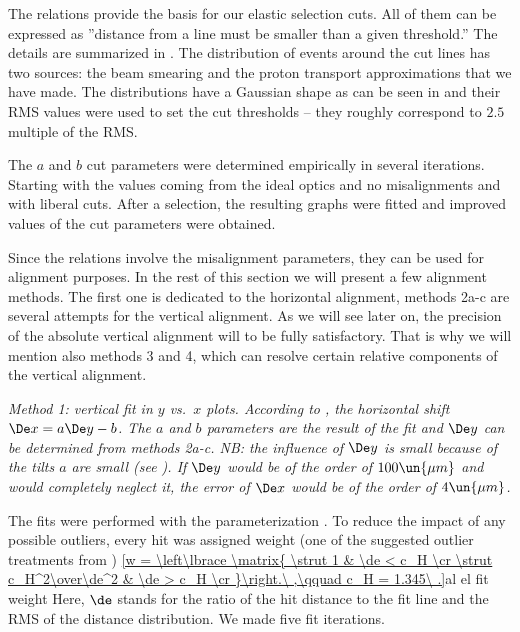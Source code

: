 The relations  provide the basis for our elastic selection cuts. All of them can be expressed as ''distance from a line must be smaller than a given threshold.'' The details are summarized in . The distribution of events around the cut lines has two sources: the beam smearing and the proton transport approximations that we have made. The distributions have a Gaussian shape as can be seen in  and their RMS values were used to set the cut thresholds -- they roughly correspond to $2.5$ multiple of the RMS.

The $a$ and $b$ cut parameters were determined empirically in several iterations. Starting with the values coming from the ideal optics and no misalignments and with liberal cuts. After a selection, the resulting graphs were fitted and improved values of the cut parameters were obtained.


Since the relations  involve the misalignment parameters, they can be used for alignment purposes. In the rest of this section we will present a few alignment methods. The first one is dedicated to the horizontal alignment, methods 2a-c are several attempts for the vertical alignment. As we will see later on, the precision of the absolute vertical alignment will to be fully satisfactory. That is why we will mention also methods 3 and 4, which can resolve certain relative components of the vertical alignment.

\em{Method 1}: vertical fit in $y$ vs.~$x$ plots. According to , the horizontal shift $\De x = a \De y - b$. The $a$ and $b$ parameters are the result of the fit and $\De y$ can be determined from methods 2a-c. NB: the influence of $\De y$ is small because of the tilts $a$ are small (see ). If $\De y$ would be of the order of $100\un{\mu m}$ and would completely neglect it, the error of $\De x$ would be of the order of $4\un{\mu m}$.

The fits were performed with the parameterization . To reduce the impact of any possible outliers, every hit was assigned weight (one of the suggested outlier treatments from )
\eqref{w = \left\lbrace \matrix{
\strut 1				& \de < c_H \cr
\strut c_H^2\over\de^2	& \de > c_H \cr
}\right.\ ,\qquad c_H = 1.345\ .}{al el fit weight}
Here, $\de$ stands for the ratio of the hit distance to the fit line and the RMS of the distance distribution. We made five fit iterations.

